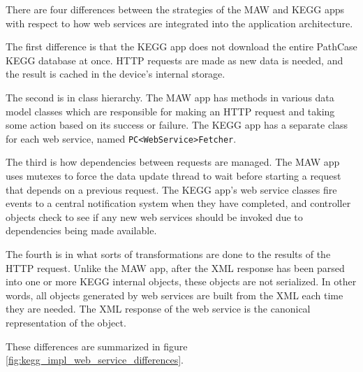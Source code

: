 There are four differences between the strategies of the MAW and KEGG apps
with respect to how web services are integrated into the application
architecture.

The first difference is that the KEGG app does not download the entire PathCase
KEGG database at once. HTTP requests are made as new data is needed, and the
result is cached in the device's internal storage.

The second is in class hierarchy. The MAW app has methods in various data model
classes which are responsible for making an HTTP request and taking some action
based on its success or failure. The KEGG app has a separate class for each web
service, named \texttt{PC<WebService>Fetcher}.

The third is how dependencies between requests are managed. The MAW app uses
mutexes to force the data update thread to wait before starting a request that
depends on a previous request. The KEGG app's web service classes fire events to
a central notification system when they have completed, and controller objects
check to see if any new web services should be invoked due to dependencies being
made available.

The fourth is in what sorts of transformations are done to the results of the
HTTP request. Unlike the MAW app, after the XML response has been parsed into
one or more KEGG internal objects, these objects are not serialized. In other
words, all objects generated by web services are built from the XML each time
they are needed. The XML response of the web service is the canonical
representation of the object.

These differences are summarized in figure
\ref{fig:kegg_impl_web_service_differences}.

